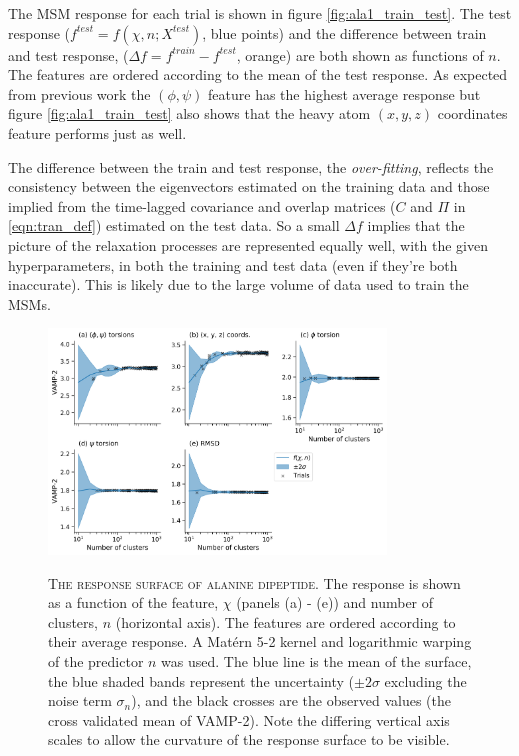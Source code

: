 The MSM response for each trial is shown in figure \ref{fig:ala1_train_test}. The test response ($f^{test} = f(\chi, n; X^{test})$, blue points) and the difference between train and test response, ($\Delta f = f^{train} - f^{test}$, orange) are both shown as functions of $n$. The features are ordered according to the  mean of the test response. As expected from previous work \cite{bolhuis2000reaction} the  $(\phi, \psi)$ feature has the highest average response but figure \ref{fig:ala1_train_test} also shows that the heavy atom $(x,y,z)$ coordinates feature performs just as well. 

The difference between the train and test response, the \emph{over-fitting}, reflects the consistency between the eigenvectors estimated on the training data and those implied from the time-lagged covariance and overlap matrices ($C$ and $\Pi$  in \ref{eqn:tran_def}) estimated  on the test data. So a small $\Delta f$ implies that the picture of the relaxation processes are represented equally well, with the given hyperparameters, in both the training and test data (even if they're both inaccurate). This is likely due to the large volume of data used to train the MSMs. 

\begin{figure}
    \centering
    \caption[The response surface of alanine dipeptide]{\textsc{The response surface of alanine dipeptide}. The response is shown as a function of the feature, $\chi$ (panels (a) - (e)) and number of clusters, $n$ (horizontal axis). The features are ordered according to their average response. A Mat\'{e}rn 5-2 kernel and logarithmic warping of the predictor $n$  was used. The blue line is the mean of the surface, the blue shaded bands represent the uncertainty ($\pm2\sigma$ excluding the noise term $\sigma_{n}$), and the black crosses are the observed values (the cross validated mean of VAMP-2). Note the differing vertical axis scales to allow the curvature of the response surface to be visible.}
    \includegraphics[width=0.8\textwidth]{chapters/msm_optimization/figures/ala1_response_surface.png}
    \label{fig:ala1_response}
\end{figure}

